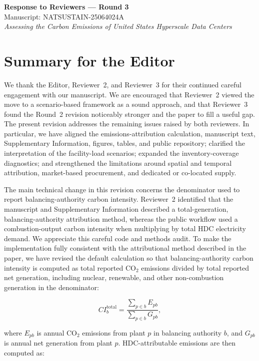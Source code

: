 \documentclass[11pt]{article}
\begin{document}
\begin{center}
    {\LARGE \textbf{Response to Reviewers --- Round 3}}\\[0.5em]
    {\large Manuscript: NATSUSTAIN-25064024A}\\
    {\large \textit{Assessing the Carbon Emissions of United States Hyperscale Data Centers}}
\end{center}

\vspace{1em}

\section*{Summary for the Editor}

We thank the Editor, Reviewer~2, and Reviewer~3 for their continued careful engagement with our manuscript. We are encouraged that Reviewer~2 viewed the move to a scenario-based framework as a sound approach, and that Reviewer~3 found the Round~2 revision noticeably stronger and the paper to fill a useful gap. The present revision addresses the remaining issues raised by both reviewers. In particular, we have aligned the emissions-attribution calculation, manuscript text, Supplementary Information, figures, tables, and public repository; clarified the interpretation of the facility-load scenarios; expanded the inventory-coverage diagnostics; and strengthened the limitations around spatial and temporal attribution, market-based procurement, and dedicated or co-located supply.

The main technical change in this revision concerns the denominator used to report balancing-authority carbon intensity. Reviewer~2 identified that the manuscript and Supplementary Information described a total-generation, balancing-authority attribution method, whereas the public workflow used a combustion-output carbon intensity when multiplying by total HDC electricity demand. We appreciate this careful code and methods audit. To make the implementation fully consistent with the attributional method described in the paper, we have revised the default calculation so that balancing-authority carbon intensity is computed as total reported CO$_2$ emissions divided by total reported net generation, including nuclear, renewable, and other non-combustion generation in the denominator:

\[
CI_b^{\mathrm{total}} =
\frac{\sum_{p \in b} E_{pb}}{\sum_{p \in b} G_{pb}},
\]

where $E_{pb}$ is annual CO$_2$ emissions from plant $p$ in balancing authority $b$, and $G_{pb}$ is annual net generation from plant $p$. HDC-attributable emissions are then computed as:
\end{document}
